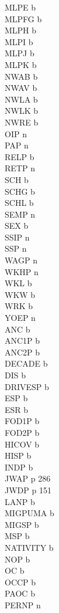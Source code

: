 \documentclass[12pt]{article}
\begin{document}
MLPE b\\
MLPFG b\\
MLPH b\\
MLPI b\\
MLPJ b\\
MLPK b\\
NWAB b\\
NWAV b\\
NWLA b\\
NWLK b\\
NWRE b\\
OIP n\\
PAP n\\
RELP b\\
RETP n\\
SCH b\\
SCHG b\\
SCHL b\\
SEMP n\\
SEX b\\
SSIP n\\
SSP n\\
WAGP n\\
WKHP n\\
WKL b\\
WKW b\\
WRK b\\
YOEP n\\
ANC b\\
ANC1P b\\
ANC2P b\\
DECADE b\\
DIS b\\
DRIVESP b\\
ESP b\\
ESR b\\
FOD1P b\\
FOD2P b\\
HICOV b\\
HISP b\\
INDP b\\
JWAP p 286\\
JWDP p 151\\
LANP b\\
MIGPUMA b\\
MIGSP b\\
MSP b\\
NATIVITY b\\
NOP b\\
OC b\\
OCCP b\\
PAOC b\\
PERNP n\\
\end{document}
